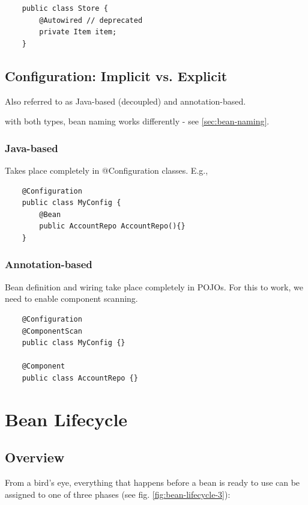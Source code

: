\documentclass{scrartcl}
\begin{document}
\begin{lstlisting}
    public class Store {
        @Autowired // deprecated
        private Item item;
    }
\end{lstlisting}

\subsection{Configuration: Implicit vs. Explicit}

Also referred to as Java-based (decoupled) and annotation-based.

with both types, bean naming works differently - see \ref{sec:bean-naming}.

\subsubsection{Java-based}

Takes place completely in @Configuration classes. E.g.,

\begin{lstlisting}
    @Configuration
    public class MyConfig {
        @Bean
        public AccountRepo AccountRepo(){}
    }
\end{lstlisting}

\subsubsection{Annotation-based}

Bean definition and wiring take place completely in POJOs. For this to work, we need to enable component scanning.

\begin{lstlisting}
    @Configuration
    @ComponentScan
    public class MyConfig {}

    @Component
    public class AccountRepo {}
\end{lstlisting}

\section{Bean Lifecycle}
\subsection{Overview}

From a bird's eye, everything that happens before a bean is ready to use can be assigned to one of three phases (see fig. \ref{fig:bean-lifecycle-3}):
\end{document}
